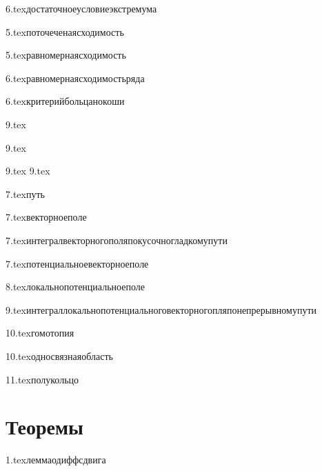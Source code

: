 {6.tex}{достаточноеусловиеэкстремума}

{5.tex}{поточеченаясходимость}

{5.tex}{равномернаясходимость}

{6.tex}{равномернаясходимостьряда}

{6.tex}{критерийбольцанокоши}

{9.tex}{}


{9.tex}{}
\?

{9.tex}{}\?
{9.tex}{}\?

{7.tex}{путь}

{7.tex}{векторноеполе}

{7.tex}{интегралвекторногополяпокусочногладкомупути}

{7.tex}{потенциальноевекторноеполе}

{8.tex}{локальнопотенциальноеполе}

{9.tex}{интеграллокальнопотенциальноговекторногопляпонепрерывномупути}

{10.tex}{гомотопия}

{10.tex}{односвязнаяобласть}

{11.tex}{полукольцо}

\section{Теоремы}

{1.tex}{леммаодиффсдвига}


